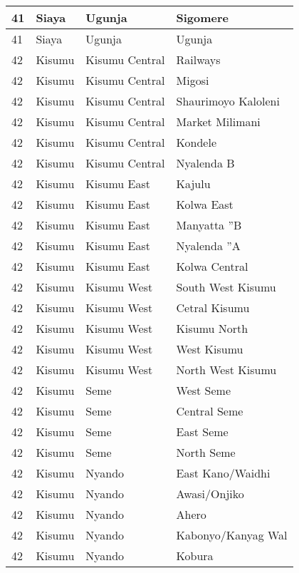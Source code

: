 \begin{table}[!ht]
\begin{tabular}{|l|l|l|l|}
        41 & Siaya & Ugunja & Sigomere \\ \hline
        41 & Siaya & Ugunja & Ugunja \\ \hline
        42 & Kisumu & Kisumu Central & Railways \\ \hline
        42 & Kisumu & Kisumu Central & Migosi \\ \hline
        42 & Kisumu & Kisumu Central & Shaurimoyo Kaloleni \\ \hline
        42 & Kisumu & Kisumu Central & Market Milimani \\ \hline
        42 & Kisumu & Kisumu Central & Kondele \\ \hline
        42 & Kisumu & Kisumu Central & Nyalenda B \\ \hline
        42 & Kisumu & Kisumu East & Kajulu \\ \hline
        42 & Kisumu & Kisumu East & Kolwa East \\ \hline
        42 & Kisumu & Kisumu East & Manyatta ''B \\ \hline
        42 & Kisumu & Kisumu East & Nyalenda ''A \\ \hline
        42 & Kisumu & Kisumu East & Kolwa Central \\ \hline
        42 & Kisumu & Kisumu West & South West Kisumu \\ \hline
        42 & Kisumu & Kisumu West & Cetral Kisumu \\ \hline
        42 & Kisumu & Kisumu West & Kisumu North \\ \hline
        42 & Kisumu & Kisumu West & West Kisumu \\ \hline
        42 & Kisumu & Kisumu West & North West Kisumu \\ \hline
        42 & Kisumu & Seme & West Seme \\ \hline
        42 & Kisumu & Seme & Central Seme \\ \hline
        42 & Kisumu & Seme & East Seme \\ \hline
        42 & Kisumu & Seme & North Seme \\ \hline
        42 & Kisumu & Nyando & East Kano/Waidhi \\ \hline
        42 & Kisumu & Nyando & Awasi/Onjiko \\ \hline
        42 & Kisumu & Nyando & Ahero \\ \hline
        42 & Kisumu & Nyando & Kabonyo/Kanyag Wal \\ \hline
        42 & Kisumu & Nyando & Kobura \\ \hline

\end{tabular}
\end{table}
